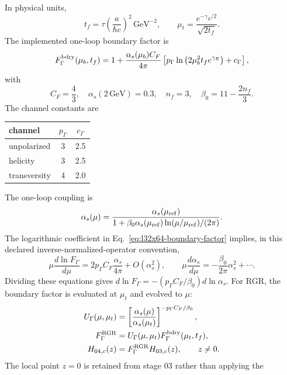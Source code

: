 \documentclass[11pt]{article}
\numberwithin{equation}{section}
\begin{document}
In physical units,
\begin{equation}
 t_f=\tau\left(\frac{a}{\hbar c}\right)^2\,\mathrm{GeV}^{-2},\qquad
 \mu_t=\frac{e^{-\gamma_E/2}}{\sqrt{2t_f}}.
\label{eq:l32x64-natural-scale}
\end{equation}
The implemented one-loop boundary factor is
\begin{equation}
 F_\Gamma^{\rm bdry}(\mu_b,t_f)=
 1+\frac{\alpha_s(\mu_b)C_F}{4\pi}
 \left[p_\Gamma\ln\left(2\mu_b^2t_f e^{\gamma_E}\right)+c_\Gamma\right],
\label{eq:l32x64-boundary-factor}
\end{equation}
with
\[
 C_F=\frac43,\quad \alpha_s(2\,\mathrm{GeV})=0.3,\quad n_f=3,\quad
 \beta_0=11-\frac{2n_f}{3}.
\]
The channel constants are
\begin{center}
\begin{tabular}{@{}lcc@{}}
\toprule
channel & \(p_\Gamma\) & \(c_\Gamma\)\\
\midrule
unpolarized & 3 & 2.5\\
helicity & 3 & 2.5\\
transversity & 4 & 2.0\\
\bottomrule
\end{tabular}
\end{center}
The one-loop coupling is
\begin{equation}
 \alpha_s(\mu)=
 \frac{\alpha_s(\mu_{\rm ref})}
 {1+\beta_0\alpha_s(\mu_{\rm ref})
       \ln(\mu/\mu_{\rm ref})/(2\pi)} .
\label{eq:l32x64-alpha-running}
\end{equation}
The logarithmic coefficient in Eq.~\eqref{eq:l32x64-boundary-factor}
implies, in this declared inverse-normalized-operator convention,
\begin{equation}
 \mu\frac{d\ln F_\Gamma}{d\mu}
 =2p_\Gamma C_F\frac{\alpha_s}{4\pi}+O(\alpha_s^2),\qquad
 \mu\frac{d\alpha_s}{d\mu}
 =-\frac{\beta_0}{2\pi}\alpha_s^2+\cdots.
\end{equation}
Dividing these equations gives
\(d\ln F_\Gamma=-(p_\Gamma C_F/\beta_0)d\ln\alpha_s\).
For RGR, the boundary factor is evaluated at \(\mu_t\) and evolved to
\(\mu\):
\begin{align}
 U_\Gamma(\mu,\mu_t)
 &=\left[\frac{\alpha_s(\mu)}{\alpha_s(\mu_t)}\right]^{
 -p_\Gamma C_F/\beta_0},\\
 F_\Gamma^{\rm RGR}
 &=U_\Gamma(\mu,\mu_t)F_\Gamma^{\rm bdry}(\mu_t,t_f),\\
 H_{04,c}(z)&=F_\Gamma^{\rm RGR}H_{03,c}(z),\qquad z\ne0.
\label{eq:l32x64-rgr}
\end{align}
The local point \(z=0\) is retained from stage 03 rather than applying the
\end{document}
